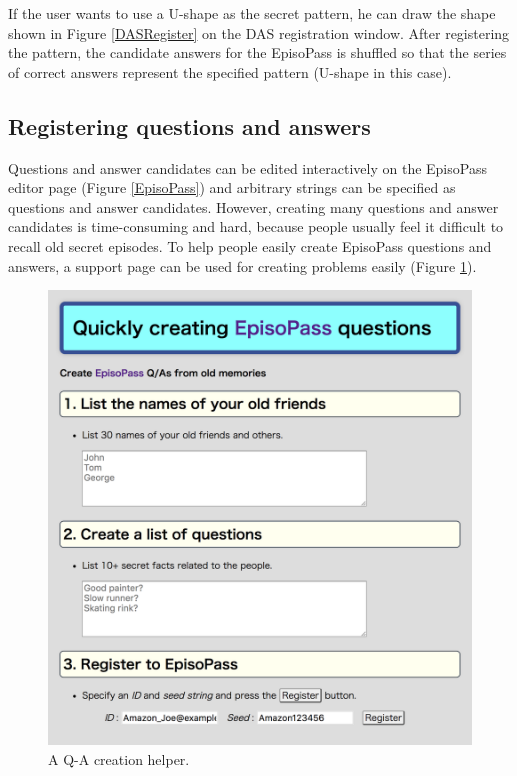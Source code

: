 \documentclass[sigconf]{acmart}
\begin{document}
If the user wants to use a U-shape as the secret pattern,
he can draw the shape shown in Figure \ref{DASRegister}
on the DAS registration window.
%
After registering the pattern, the candidate answers for the EpisoPass is
shuffled so that the series of correct answers represent the
specified pattern (U-shape in this case).

\subsection{Registering questions and answers}
\label{easyregister}

Questions and answer candidates can be edited interactively on the
EpisoPass editor page (Figure \ref{EpisoPass}) and arbitrary
strings can be specified as questions and answer candidates.
However, creating many questions and answer candidates is
time-consuming and hard, because
people usually feel it difficult to recall old secret episodes.
%
To help people easily create EpisoPass questions and answers,
a support page can be used for creating problems easily
(Figure \ref{Easy}).

\begin{figure}[t]
  \includegraphics[width=12cm,bb=0 0 1522 1632]{figures/Easy.png}
  \caption{A Q-A creation helper.}
  \label{Easy}
\end{figure}
\end{document}
